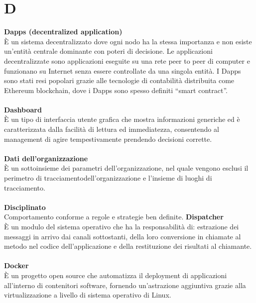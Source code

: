 \section{D}
\textbf{Dapps (decentralized application)}\\
È un sistema decentralizzato dove ogni nodo ha la stessa importanza e non esiste un'entità centrale dominante con poteri di decisione. Le applicazioni decentralizzate sono applicazioni eseguite su una rete peer to peer di computer e funzionano su Internet senza essere controllate da una singola entità. I Dapps sono stati resi popolari grazie alle tecnologie di contabilità distribuita come Ethereum blockchain, dove i Dapps sono spesso definiti “smart contract”. \\ \\
\textbf{Dashboard}\\
È un tipo di interfaccia utente grafica che mostra informazioni generiche ed è caratterizzata dalla facilità di lettura ed immediatezza, consentendo al management di agire tempestivamente prendendo decisioni corrette. \\ \\
\textbf{Dati dell'organizzazione}\\
È un sottoinsieme dei parametri dell'organizzazione, nel quale vengono esclusi il perimetro di tracciamentodell'organizzazione e l'insieme di luoghi di tracciamento. \\ \\
\textbf{Disciplinato}\\
Comportamento conforme a regole e strategie ben definite.
\textbf{Dispatcher}\\
È un modulo del sistema operativo che ha la responsabilità di: estrazione dei messaggi in arrivo dai canali sottostanti, della loro conversione in chiamate al metodo nel codice dell'applicazione e della restituzione dei risultati al chiamante. \\ \\
\textbf{Docker}\\
È un progetto open source che automatizza il deployment di applicazioni all'interno di contenitori software, fornendo un'astrazione aggiuntiva grazie alla virtualizzazione a livello di sistema operativo di Linux. \\ \\
\clearpage